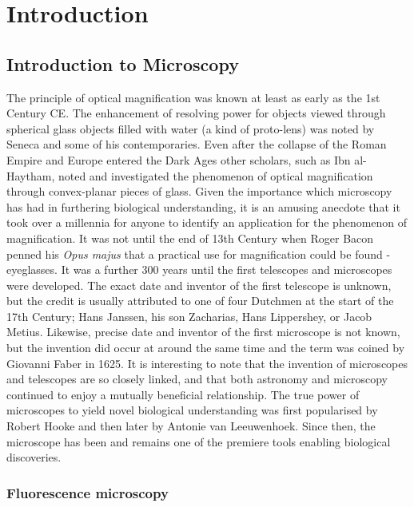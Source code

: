 \chapter{Introduction}

\section{Introduction to Microscopy}
\label{sec:microscopy}

The principle of optical magnification was known at least as early as the 1st 
Century CE. The enhancement of resolving power for objects viewed through 
spherical glass objects filled with water (a kind of proto-lens) was noted by 
Seneca and some of his contemporaries\cite{seneca1971naturales}. Even after 
the collapse of the Roman Empire and Europe entered the Dark Ages other 
scholars, such as Ibn al-Haytham, noted and investigated the phenomenon of 
optical magnification through convex-planar pieces of 
glass\cite{nasr1968science}. Given the importance which microscopy has had in 
furthering biological understanding, it is an amusing anecdote that it took 
over a millennia for anyone to identify an application for the phenomenon of 
magnification. It was not until the end of 13th Century  when Roger Bacon 
penned his \textit{Opus majus} that a practical use for magnification could 
be found - eyeglasses. It was a further 300 years until the first telescopes 
and microscopes were developed. The exact date and inventor of the first 
telescope is unknown, but the credit is usually attributed to one of four 
Dutchmen at the start of the 17th Century; Hans Janssen, his son Zacharias, 
Hans Lippershey, or Jacob Metius. Likewise, precise date and inventor of the 
first microscope is not known, but the invention did occur at around the same 
time and the term was coined by Giovanni Faber in 
1625\cite{bardell2004invention}. It is interesting to note that the invention 
of microscopes and telescopes are so closely linked, and that both astronomy 
and microscopy continued to enjoy a mutually beneficial relationship. The true 
power of microscopes to yield novel biological understanding was first 
popularised by Robert Hooke and then later by Antonie van 
Leeuwenhoek\cite{hooke1665micrographia, chung2017pioneers}. Since then, the 
microscope has been and remains one of the premiere tools enabling biological 
discoveries.

\subsection{Fluorescence microscopy}
\label{subsec:fluorescence}

